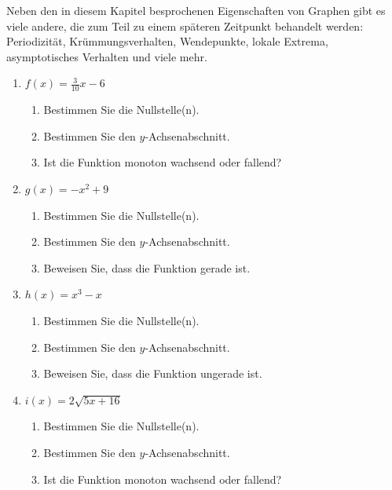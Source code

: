 Neben den in diesem Kapitel besprochenen Eigenschaften von Graphen gibt es viele andere, die zum Teil zu einem späteren Zeitpunkt behandelt werden: Periodizität, Krümmungsverhalten, Wendepunkte, lokale Extrema, asymptotisches Verhalten und viele mehr.


















\clearpage
\begin{ueb}
    {}{}


    \begin{enumerate}
        \item \(f(x)=\frac{3}{10}x-6\)
              \begin{enumerate}
                  \item Bestimmen Sie die Nullstelle(n).
                  \item Bestimmen Sie den \(y\)-Achsenabschnitt.
                  \item Ist die Funktion monoton wachsend oder fallend?
              \end{enumerate}

        \item \(g(x)=-x^2+9\)
              \begin{enumerate}
                  \item Bestimmen Sie die Nullstelle(n).
                  \item Bestimmen Sie den \(y\)-Achsenabschnitt.
                  \item Beweisen Sie, dass die Funktion gerade ist.
              \end{enumerate}

        \item \(h(x)=x^3-x\)
              \begin{enumerate}
                  \item Bestimmen Sie die Nullstelle(n).
                  \item Bestimmen Sie den \(y\)-Achsenabschnitt.
                  \item Beweisen Sie, dass die Funktion ungerade ist.
              \end{enumerate}

        \item \(i(x)=2\sqrt{5x+16}\)
              \begin{enumerate}
                  \item Bestimmen Sie die Nullstelle(n).
                  \item Bestimmen Sie den \(y\)-Achsenabschnitt.
                  \item Ist die Funktion monoton wachsend oder fallend?
              \end{enumerate}


\end{enumerate}
\end{ueb}
